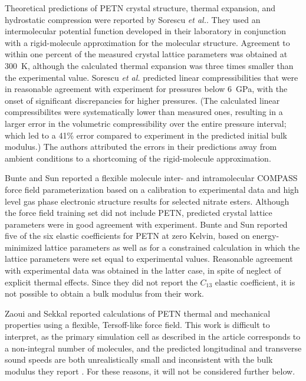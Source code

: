 \documentclass[prb,aps,nobibnotes,twocolumn,doublespace,twocolumngrid,superbib]{revtex4}
\begin{document}
Theoretical predictions of PETN crystal structure, thermal expansion, and 
hydrostatic compression were reported by 
Sorescu {\it et al.}\cite{Sorescu_1999v103A,
Sorescu_1999v103}.  They used an intermolecular potential function developed 
in their laboratory in conjunction with a rigid-molecule approximation for 
the molecular structure. Agreement to within one percent of the measured 
crystal lattice parameters was obtained at 300~K, although the calculated 
thermal expansion was three times smaller than the experimental 
value.  Sorescu {\it et al.}\cite{Sorescu_1999v103}
predicted linear compressibilities 
that were in reasonable agreement with experiment for pressures below 
6~GPa, with the onset of significant discrepancies for higher pressures.  (The 
calculated linear compressibilites were systematically lower than measured 
ones, resulting in a larger error in the volumetric compressibility 
over the entire pressure interval; which led to a 41\% error compared to 
experiment in the predicted initial bulk modulus.) The authors attributed 
the errors in their predictions away from ambient conditions to a shortcoming 
of the rigid-molecule approximation.

Bunte and Sun\cite{Bunte_2000v104}
reported a flexible molecule inter- and intramolecular COMPASS force field 
parameterization based on a calibration to experimental data and high level 
gas phase electronic structure results for selected nitrate esters.  
Although the force field training set did not include PETN, predicted 
crystal lattice parameters were in good agreement with experiment.  Bunte 
and Sun reported five of the six elastic coefficients for PETN at zero 
Kelvin, based on energy-minimized lattice parameters as well as for a
constrained calculation in which the lattice parameters were set equal to
experimental values.  Reasonable agreement with experimental data was obtained 
in the latter case, in spite of neglect of explicit thermal effects.  Since 
they did not report the $C_{13}$ elastic coefficient, it is not possible to 
obtain a bulk modulus from their work.

Zaoui and Sekkal\cite{Zaoui_2001v118} reported 
calculations of PETN thermal and mechanical properties using a flexible, 
Tersoff-like force field.  This work is difficult to interpret, as the 
primary simulation cell as described in the article corresponds to a 
non-integral number of molecules, and the predicted longitudinal and 
transverse sound speeds are both unrealistically small and inconsistent
with the bulk modulus they report .  For these reasons, it will not be 
considered further below.
\end{document}
